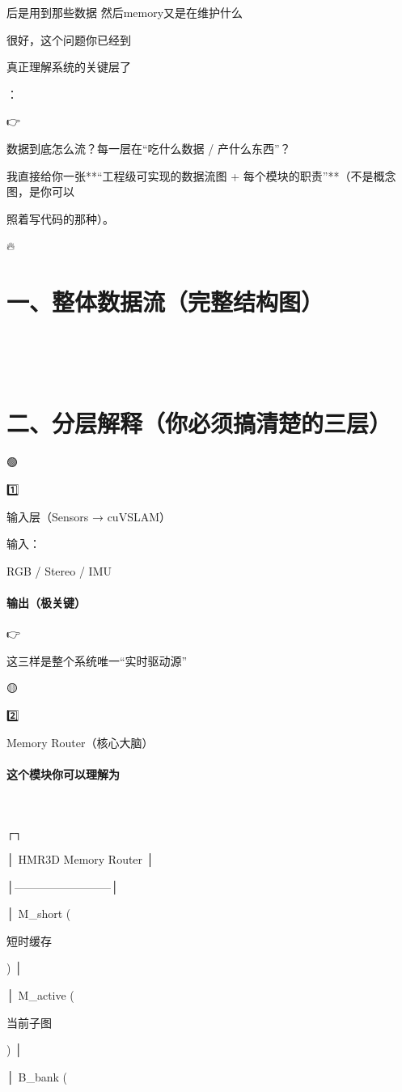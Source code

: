 \documentclass[12pt]{article}
\begin{document}
后是用到那些数据 然后memory又是在维护什么

很好，这个问题你已经到

真正理解系统的关键层了

：

👉

数据到底怎么流？每一层在“吃什么数据 / 产什么东西”？

我直接给你一张**“工程级可实现的数据流图 + 每个模块的职责”**（不是概念图，是你可以

照着写代码的那种）。

🔥

\section{一、整体数据流（完整结构图）}


🧠

\section{二、分层解释（你必须搞清楚的三层）}
🟢

1️⃣

输入层（Sensors → cuVSLAM）

输入：

RGB / Stereo / IMU

\paragraph{输出（极关键）}
👉

这三样是整个系统唯一“实时驱动源”

🟡

2️⃣

Memory Router（核心大脑）

\paragraph{这个模块你可以理解为}


┌┐

│ HMR3D Memory Router │

│--------------------------│

│ M\_short (

短时缓存

) │

│ M\_active (

当前⼦图

) │

│ B\_bank (
\end{document}
